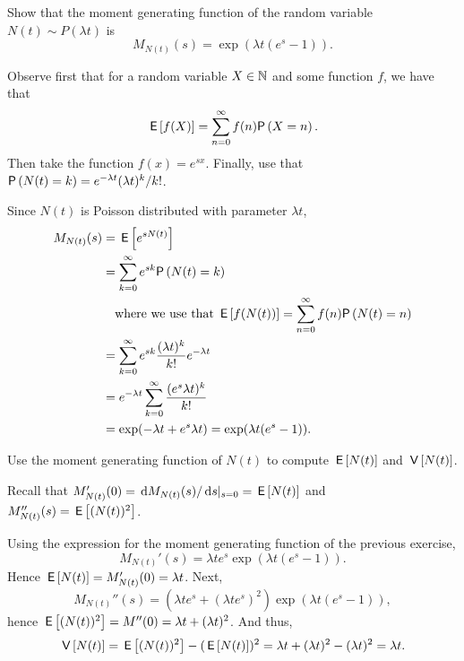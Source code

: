\begin{exercise}
Show that the moment generating function of the random variable~$N(t)\sim P(\lambda t)$ is
\begin{equation*}
M_{N(t)}(s) 
= \exp{(\lambda t(e^s-1))}.
\end{equation*}
  \begin{hint}Observe first that for a random variable $X\in\mathbb{N}$ and some function $f$, we have that
    \begin{equation*}
\E{f(X)}=\sum_{n=0}^\infty f(n) \P{X=n}.      
    \end{equation*}
Then take the function $f(x)=e^{s x}$. Finally, use that $\P{N(t)=k}=e^{-\lambda t}(\lambda t)^k/k!$.
  \end{hint}
\begin{solution}
Since $N(t)$ is Poisson distributed with parameter $\lambda t$, 
\begin{align*}
M_{N(t)}(s)
&=  \E{e^{s N(t)}} \\
&= \sum_{k=0}^\infty e^{s k} \P{N(t)=k} \\
&\quad\text{where we use that $\E{f(N(t))}=\sum_{n=0}^\infty f(n) \P{N(t)=n}$}\\
&= \sum_{k=0}^\infty e^{s k} \frac{(\lambda t)^k}{k!} e^{-\lambda t}  \\
&= e^{-\lambda t} \sum_{k=0}^\infty  \frac{(e^s \lambda t)^k}{k!}  \\
&= \exp(-\lambda t + e^s \lambda t) =\exp(\lambda t(e^s - 1)).
\end{align*}
\end{solution}
\end{exercise}

\begin{exercise}
Use  the moment generating function of $N(t)$ to compute $\,\mathsf{E}\left[N(t)\right]$ and $\,\mathsf{V}\left[N(t)\right]$. 
\begin{hint}
  Recall that $M_{N(t)}'(0) = \,\text{d}M_{N(t)}(s)/\,\text{d}s|_{s=0} = \,\mathsf{E}\left[N(t)\right]$ and $M_{N(t)}''(s)= \,\mathsf{E}\left[(N(t))^2\right]$. 
\end{hint}
\begin{solution}
Using the expression for the moment generating function of the previous exercise,
  \begin{equation*}
    M_{N(t)}'(s) = \lambda t e^s \exp(\lambda t(e^s - 1)).
  \end{equation*}
Hence $\,\mathsf{E}\left[N(t)\right] = M_{N(t)}'(0) = \lambda t $. Next, 
  \begin{equation*}
    M_{N(t)}''(s) = (\lambda t e^s + (\lambda t e^s)^2) \exp(\lambda t(e^s - 1)),
  \end{equation*}
hence $\,\mathsf{E}\left[(N(t))^2\right] = M''(0) = \lambda t + (\lambda t)^2$. And thus, 
\begin{equation*}
\,\mathsf{V}\left[N(t)\right] =\,\mathsf{E}\left[(N(t))^2\right]-(\,\mathsf{E}\left[N(t)\right])^2 = \lambda t + (\lambda t)^2 - (\lambda t)^2 = \lambda t.
\end{equation*}
\end{solution}
\end{exercise}

